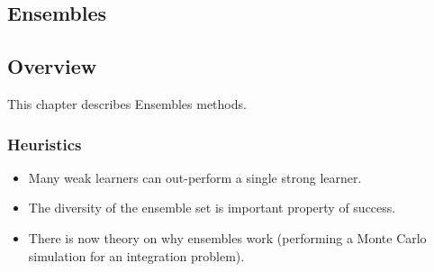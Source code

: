 

\renewcommand{\bibsection}{\subsection{\bibname}}
\begin{bibunit}

\chapter{Ensembles}
\label{ch:ensembles}

\section{Overview}
This chapter describes Ensembles methods.


\subsection{Heuristics}

\begin{itemize}
	\item Many weak learners can out-perform a single strong learner.
	\item The diversity of the ensemble set is important property of success.
	\item There is now theory on why ensembles work (performing a Monte Carlo simulation for an integration problem).
\end{itemize}


\putbib
\end{bibunit}


\newpage\begin{bibunit}\putbib\end{bibunit}
\newpage\begin{bibunit}\putbib\end{bibunit}
\newpage\begin{bibunit}\putbib\end{bibunit}
